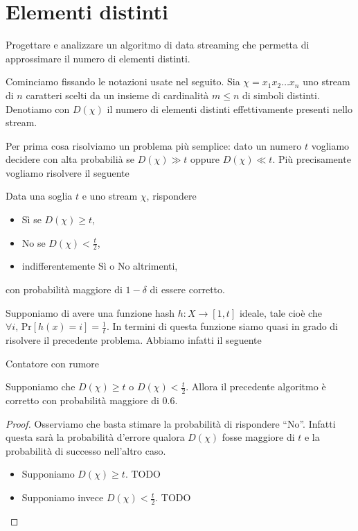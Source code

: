 \chapter{Elementi distinti}

\begin{problem*}
    Progettare e analizzare un algoritmo di data streaming che permetta di
    approssimare il numero di elementi distinti.
\end{problem*}

Cominciamo fissando le notazioni usate nel seguito. Sia \(\chi = x_1 x_2
\dots x_n\) uno stream di \(n\) caratteri scelti da un insieme di cardinalit\`a
\(m\le n\) di simboli distinti. Denotiamo con \(D(\chi)\) il numero di elementi
distinti effettivamente presenti nello stream.

Per prima cosa risolviamo un problema pi\`u semplice: dato un numero \(t\)
vogliamo decidere con alta probabili\`a se \(D(\chi) \gg t\) oppure \(D(\chi) \ll
t\). Pi\`u precisamente vogliamo risolvere il seguente
\begin{problem*}
  Data una soglia \(t\) e uno stream \(\chi\), rispondere
  \begin{itemize}
    \item S\`i se \(D(\chi)\ge t\),
    \item No se \(D(\chi)<\frac{t}{2}\),
    \item indifferentemente S\`i o No altrimenti,
  \end{itemize}
  con probabilit\`a maggiore di \(1 - \delta\) di essere corretto.
\end{problem*}

Supponiamo di avere una funzione hash \(h:X\rightarrow [1,t]\) ideale, tale
cio\`e che \(\forall i\mbox{, Pr}[h(x)=i]=\frac{1}{t}\). In termini di
questa funzione siamo quasi in grado di risolvere il precedente problema.
Abbiamo infatti il seguente
\begin{algorithm}
  \caption{Contatore con rumore}
  \begin{algorithmic}[1]
        \State {}
      \EndIf
    \EndFor
    \State {}
    \EndFunction
  \end{algorithmic}
\end{algorithm}

\begin{lemma}
  Supponiamo che \(D(\chi)\ge t\) o \(D(\chi)<\frac{t}{2}\). Allora il precedente
  algoritmo \`e corretto con probabilit\`a maggiore di \(0.6\).
\end{lemma}
\begin{proof}
  Osserviamo che basta stimare la probabilit\`a di rispondere ``No''. Infatti
  questa sar\`a la probabilit\`a d'errore qualora \(D(\chi)\) fosse maggiore di
  \(t\) e la probabilit\`a di successo nell'altro caso.
  \begin{itemize}
    \item Supponiamo \(D(\chi)\ge t\). TODO
    \item Supponiamo invece \(D(\chi)<\frac{t}{2}\). TODO
  \end{itemize}
\end{proof}

